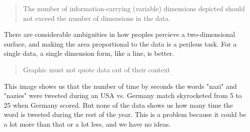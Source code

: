 \begin{quote}
The number of information-carrying (variable) dimensions depicted should not exceed the number of dimensions in the data.
\end{quote}
There are considerable ambiguities in how peoples percieve a two-dimensional surface, and making the area proportional to the data is a perilous task. For a single data, a single dimension form, like a line, is better.

\begin{quote}
Graphic must not quote data out of their context
\end{quote}
This image shows us that the number of time by seconds the words "nazi" and "nazies" were tweeted during an USA vs. Germany match skyrocketed from 5 to 25 when Germany scored.
But none of the data shows us how many time the word is tweeted during the rest of the year. This is a problem because it could be a lot more than that or a lot less, and we have no ideas.
